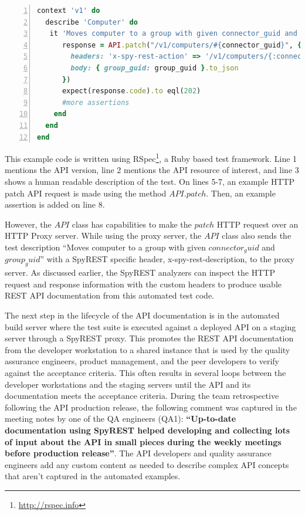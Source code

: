 \documentclass[10pt, conference]{IEEEtran}
\begin{document}
\begin{lstlisting}[language=Ruby,breaklines=true,showspaces=false,showstringspaces=false,numbers=left,xleftmargin=2em,caption={Functional Test Code},label=listing_test]
context 'v1' do
  describe 'Computer' do
   it 'Moves computer to a group with given connector_guid and group_guid' do
      response = API.patch("/v1/computers/#{connector_guid}", {
        headers: 'x-spy-rest-action' => '/v1/computers/{:connector_guid}',
        body: { group_guid: group_guid }.to_json
      })
      expect(response.code).to eql(202)
      #more assertions
    end
  end
end
\end{lstlisting}

This example code is written using RSpec\footnote{\url{http://rspec.info}}, a Ruby based test framework. Line 1 mentions the API version, line 2 mentions the API resource of interest, and line 3 shows a human readable description of the test. On lines 5-7, an example HTTP patch API request is made using the method $API.patch$. Then, an example assertion is added on line 8.

However, the $API$ class has capabilities to make the $patch$ HTTP request over an HTTP Proxy server. While using the proxy server, the $API$ class also sends the test description ``Moves computer to a group with given $connector_guid$ and $group_guid$'' with a SpyREST specific header, x-spy-rest-description, to the proxy server. As discussed earlier, the SpyREST analyzers can inspect the HTTP request and response information with the custom headers to produce usable REST API documentation from this automated test code.

The next step in the lifecycle of the API documentation is in the automated build server where the test suite is executed against a deployed API on a staging server through a SpyREST proxy. This promotes the REST API documentation from the developer workstation to a shared instance that is used by the quality assurance engineers, product management, and the peer developers to verify against the acceptance criteria. This often results in several loops between the developer workstations and the staging servers until the API and its documentation meets the acceptance criteria. During the team retrospective following the API production release, the following comment was captured in the meeting notes by one of the QA engineers (QA1):  \textbf{``Up-to-date documentation using SpyREST helped developing and collecting lots of input about the API in small pieces during the weekly meetings before production release''}. The API developers and quality assurance engineers add any custom content as needed to describe complex API concepts that aren't captured in the automated examples.
\end{document}
